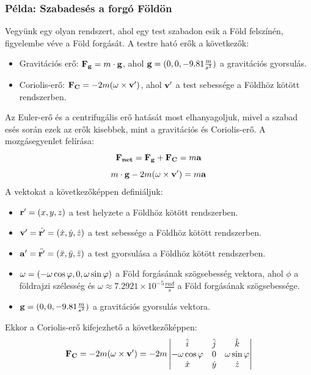 \documentclass[a4paper,12pt]{article}
\begin{document}
\subsubsection*{Példa: Szabadesés a forgó Földön}
Vegyünk egy olyan rendszert, ahol egy test szabadon esik a Föld felszínén, figyelembe véve a Föld forgását. A testre ható erők a következők:
\begin{itemize}
    \item Gravitációs erő: $\bold{F_g} = m\cdot \bold{g}$, ahol $\bold{g} = (0, 0, -9.81 \frac{m}{s^2})$ a gravitációs gyorsulás.
    \item Coriolis-erő: $\bold{F_{C}} = -2m(\bold{\omega} \times \bold{v'})$, ahol $\bold{v'}$ a test sebessége a Földhöz kötött rendszerben.
\end{itemize}
Az Euler-erő és a centrifugális erő hatását most elhanyagoljuk, mivel a szabad esés során ezek az erők kisebbek, mint a gravitációs és Coriolis-erő. A mozgásegyenlet felírása:
\begin{equation}
    \bold{F_{net}} = \bold{F_g} + \bold{F_{C}} = m\bold{a}
\end{equation}
\begin{equation}
    m\cdot \bold{g} - 2m(\bold{\omega} \times \bold{v'}) = m\bold{a}
\end{equation}
A vektokat a következőképpen definiáljuk:
\begin{itemize}
    \item $\bold{r'} = (x, y, z)$ a test helyzete a Földhöz kötött rendszerben.
    \item $\bold{v'} = \dot{\bold{r'}} = (\dot{x}, \dot{y}, \dot{z})$ a test sebessége a Földhöz kötött rendszerben.
    \item $\bold{a'} = \ddot{\bold{r'}} = (\ddot{x}, \ddot{y}, \ddot{z})$ a test gyorsulása a Földhöz kötött rendszerben.
    \item $\bold{\omega} = (-\omega\cos\varphi, 0, \omega\sin\varphi)$ a Föld forgásának szögsebesség vektora, ahol $\phi$ a földrajzi szélesség és $\omega \approx 7.2921 \times 10^{-5} \frac{rad}{s}$ a Föld forgásának szögsebessége.
    \item $\bold{g} = (0, 0, -9.81 \frac{m}{s^2})$ a gravitációs gyorsulás vektora.
\end{itemize}
Ekkor a Coriolis-erő kifejezhető a következőképpen:
\begin{equation}
    \bold{F_{C}} = -2m(\bold{\omega} \times \bold{v'}) = -2m \begin{vmatrix}
    \hat{i} & \hat{j} & \hat{k} \\
    -\omega\cos\varphi & 0 & \omega\sin\varphi \\
    \dot{x} & \dot{y} & \dot{z}
    \end{vmatrix}
\end{equation}
\end{document}
